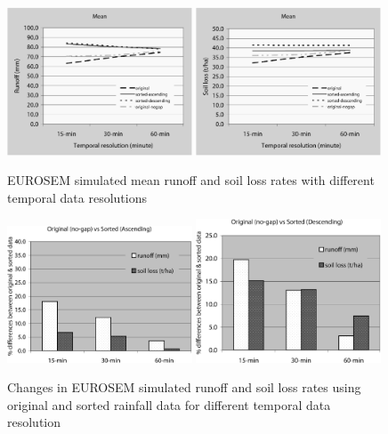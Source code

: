 \begin{figure}[htbp]
  \centering
    \includegraphics[width=0.49\textwidth]{./img/eurosem_mean_runoff}
    \includegraphics[width=0.49\textwidth]{./img/eurosem_mean_soilloss}
  \caption{EUROSEM simulated mean runoff and soil loss rates with different
temporal data resolutions}
  \label{fig:eurosem_mean_runoff_soilloss_diff}
\end{figure}

\begin{figure}[htbp]
  \centering
    \includegraphics[width=0.49\textwidth]
{./img/eurosem_diff_runoff_soilloss_asc}
    \includegraphics[width=0.49\textwidth]
{./img/eurosem_diff_runoff_soilloss_des}
  \caption{Changes in EUROSEM simulated runoff and soil loss rates using
original and sorted rainfall data for different temporal data resolution}
  \label{fig:eurosem_diff_runoff_soilloss}
\end{figure}

